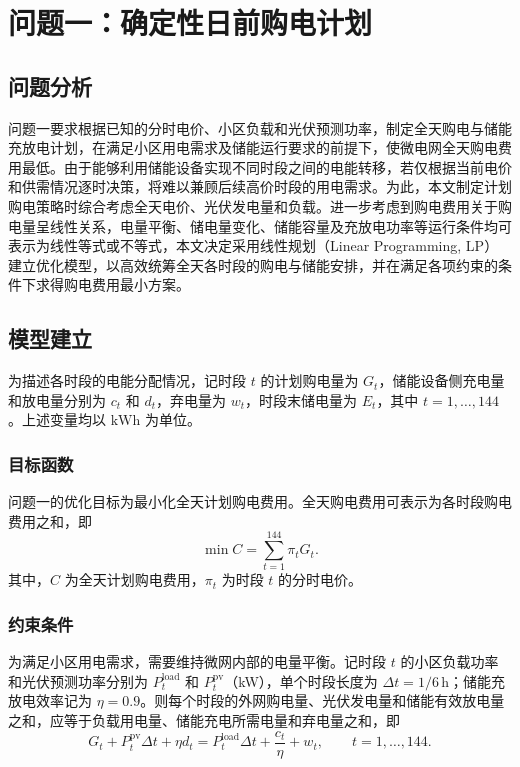 \section{问题一：确定性日前购电计划}

\subsection{问题分析}

问题一要求根据已知的分时电价、小区负载和光伏预测功率，制定全天购电与储能充放电计划，在满足小区用电需求及储能运行要求的前提下，使微电网全天购电费用最低。由于能够利用储能设备实现不同时段之间的电能转移，若仅根据当前电价和供需情况逐时决策，将难以兼顾后续高价时段的用电需求。为此，本文制定计划购电策略时综合考虑全天电价、光伏发电量和负载。进一步考虑到购电费用关于购电量呈线性关系，电量平衡、储电量变化、储能容量及充放电功率等运行条件均可表示为线性等式或不等式，本文决定采用线性规划（Linear Programming, LP）建立优化模型，以高效统筹全天各时段的购电与储能安排，并在满足各项约束的条件下求得购电费用最小方案。

\subsection{模型建立}

为描述各时段的电能分配情况，记时段 $t$ 的计划购电量为 $G_t$，储能设备侧充电量和放电量分别为 $c_t$ 和 $d_t$，弃电量为 $w_t$，时段末储电量为 $E_t$，其中 $t=1,\ldots,144$。上述变量均以 $\mathrm{kWh}$ 为单位。

\subsubsection{目标函数}

问题一的优化目标为最小化全天计划购电费用。全天购电费用可表示为各时段购电费用之和，即
\begin{equation}
\min C=\sum_{t=1}^{144}\pi_t G_t.
\label{eq:q1_objective}
\end{equation}
其中，$C$ 为全天计划购电费用，$\pi_t$ 为时段 $t$ 的分时电价。

\subsubsection{约束条件}


为满足小区用电需求，需要维持微网内部的电量平衡。记时段 $t$ 的小区负载功率和光伏预测功率分别为 $P_t^{\mathrm{load}}$ 和 $P_t^{\mathrm{pv}}$（kW），单个时段长度为 $\Delta t=1/6\,\mathrm{h}$；储能充放电效率记为 $\eta=0.9$。则每个时段的外网购电量、光伏发电量和储能有效放电量之和，应等于负载用电量、储能充电所需电量和弃电量之和，即
\begin{equation}
G_t+P_t^{\mathrm{pv}}\Delta t+\eta d_t
=
P_t^{\mathrm{load}}\Delta t+\frac{c_t}{\eta}+w_t,
\qquad t=1,\ldots,144.
\label{eq:q1_energy_balance}
\end{equation}

